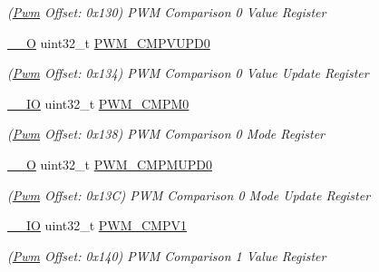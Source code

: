 \begin{DoxyCompactItemize}
\begin{DoxyCompactList}\small\item\em (\mbox{\hyperlink{structPwm}{Pwm}} Offset\+: 0x130) P\+WM Comparison 0 Value Register \end{DoxyCompactList}\item 
\mbox{\label{structPwm_a9f5ce2f411f4a54b3deb7638e65c3ade}} 
\mbox{\hyperlink{core__cm7_8h_a7e25d9380f9ef903923964322e71f2f6}{\+\_\+\+\_\+O}} uint32\+\_\+t \mbox{\hyperlink{structPwm_a9f5ce2f411f4a54b3deb7638e65c3ade}{P\+W\+M\+\_\+\+C\+M\+P\+V\+U\+P\+D0}}
\begin{DoxyCompactList}\small\item\em (\mbox{\hyperlink{structPwm}{Pwm}} Offset\+: 0x134) P\+WM Comparison 0 Value Update Register \end{DoxyCompactList}\item 
\mbox{\label{structPwm_a71825aef4114b4cbe43830703fc1214e}} 
\mbox{\hyperlink{core__cm7_8h_aec43007d9998a0a0e01faede4133d6be}{\+\_\+\+\_\+\+IO}} uint32\+\_\+t \mbox{\hyperlink{structPwm_a71825aef4114b4cbe43830703fc1214e}{P\+W\+M\+\_\+\+C\+M\+P\+M0}}
\begin{DoxyCompactList}\small\item\em (\mbox{\hyperlink{structPwm}{Pwm}} Offset\+: 0x138) P\+WM Comparison 0 Mode Register \end{DoxyCompactList}\item 
\mbox{\label{structPwm_a33c05f01bf39705b236837cb4c755b10}} 
\mbox{\hyperlink{core__cm7_8h_a7e25d9380f9ef903923964322e71f2f6}{\+\_\+\+\_\+O}} uint32\+\_\+t \mbox{\hyperlink{structPwm_a33c05f01bf39705b236837cb4c755b10}{P\+W\+M\+\_\+\+C\+M\+P\+M\+U\+P\+D0}}
\begin{DoxyCompactList}\small\item\em (\mbox{\hyperlink{structPwm}{Pwm}} Offset\+: 0x13C) P\+WM Comparison 0 Mode Update Register \end{DoxyCompactList}\item 
\mbox{\label{structPwm_a275ae0a19a7738b381b256bf74965d00}} 
\mbox{\hyperlink{core__cm7_8h_aec43007d9998a0a0e01faede4133d6be}{\+\_\+\+\_\+\+IO}} uint32\+\_\+t \mbox{\hyperlink{structPwm_a275ae0a19a7738b381b256bf74965d00}{P\+W\+M\+\_\+\+C\+M\+P\+V1}}
\begin{DoxyCompactList}\small\item\em (\mbox{\hyperlink{structPwm}{Pwm}} Offset\+: 0x140) P\+WM Comparison 1 Value Register \end{DoxyCompactList}\item 

\end{DoxyCompactItemize}
